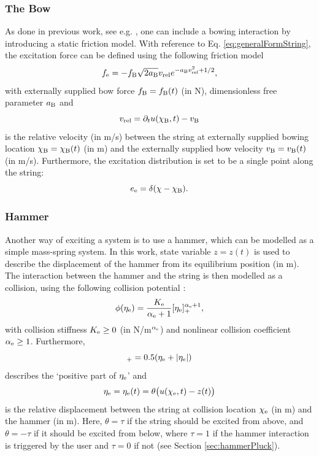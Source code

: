 \documentclass{article}
\begin{document}
\subsubsection{The Bow}
As done in previous work, see e.g. \cite{Willemsen2019}, one can include a bowing interaction by introducing a static friction model. With reference to Eq. \eqref{eq:generalFormString}, the excitation force can be defined using the following friction model \cite{theBible}
\begin{equation}\label{eq:bowForce}
    f_\text{e} = - f_{\text{B}}\sqrt{2a_{\text{B}}}v_\text{rel} e^{-a_{\text{B}}v_\text{rel}^2+1/2},
\end{equation}
with externally supplied bow force $f_{\text{B}} = f_{\text{B}}(t)$ (in N), dimensionless free parameter $a_{\text{B}}$ and 
\begin{equation}\label{eq:vrel}
    v_\text{rel} = \partial_t u(\chi_{\text{B}}, t) - v_{\text{B}}
\end{equation}
is the relative velocity (in m/s) between the string at externally supplied bowing location $\chi_{\text{B}} = \chi_{\text{B}}(t)$ (in m) and the externally supplied bow velocity $v_{\text{B}} = v_{\text{B}}(t)$ (in m/s).
Furthermore, the excitation distribution is set to be a single point along the string:
\begin{equation}\label{eq:bowDistribution}
    e_\text{e} = \delta(\chi - \chi_{\text{B}}).
\end{equation}

\subsubsection{Hammer}
Another way of exciting a system is to use a hammer, which can be modelled as a simple mass-spring system. In this work, state variable $z = z(t)$ is used to describe the displacement of the hammer from its equilibrium position (in m). The interaction between the hammer and the string is then modelled as a collision, using the following collision potential \cite{Hertz1881}:
\begin{equation}\label{eq:potential}
    \phi(\eta_{\text{e}}) = \frac{K_{\text{e}}}{\alpha_{\text{e}}+1}[\eta_{\text{e}}]_+^{\alpha_{\text{e}}+1},
\end{equation}
with collision stiffness $K_{\text{e}} \geq 0$ (in N/m$^{\alpha_{\text{e}}}$) and nonlinear collision coefficient $\alpha_{\text{e}} \geq 1$. Furthermore, 
\begin{equation}
    [\eta_\etxt]_+ = 0.5 (\eta_\etxt + |\eta_\etxt|)
\end{equation} 
describes the `positive part of $\eta_{\text{e}}$' and
\begin{equation}
    \eta_{\text{e}} = \eta_{\text{e}}(t) = \theta\big(u(\chi_{\text{e}}, t) - z(t)\big)
\end{equation}
is the relative displacement between the string at collision location $\chi_{\text{e}}$ (in m) and the hammer (in m). Here, $\theta = \tau$ if the string should be excited from above, and $\theta = -\tau$ if it should be excited from below, where $\tau = 1$ if the hammer interaction is triggered by the user and $\tau = 0$ if not (see Section \ref{sec:hammerPluck}). 
\end{document}

